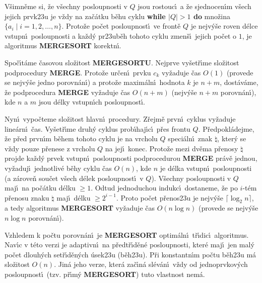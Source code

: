 \documentclass[a4paper,12pt]{article}
\begin{document}
\flushpar V\v simn\v eme si, \v ze v\v sechny posloupnosti v $Q$ jsou 
rostouc\'\i\ a \v ze sjednocen\'\i m v\v sech jejich prvk\accent23u  
je v\v zdy na za\v c\'atku b\v ehu cyklu {\bf while 
$|Q|>1$ do} mno\v zina $\{a_i\mid i=1,2,\dots,n\}$. 
Proto\v ze po\v cet 
posloupnost\'\i\ ve front\v e $Q$ je nejv\'y\v se roven d\'elce vstupn\'\i\ 
posloupnosti a ka\v zd\'y pr\accent23ub\v eh tohoto 
cyklu zmen\v s\'\i\ jejich po\v cet o $1$, je algoritmus {\bf MERGE\-SORT} korektn\'\i .
\medskip

\flushpar Spo\v c\'\i t\'ame \v casovou slo\v zitost {\bf MERGESORTU}. 
Nejprve vy\v set\v r\'\i me slo\-\v zi\-tost podprocedury {\bf MER\-GE}. Proto\v ze 
ur\v cen\'\i\ prvku $c_k$ vy\v za\-du\-je \v cas $O(1)$ (provede se 
nejv\'y\v se jedno porovn\'an\'\i ) a 
proto\v ze maxim\'aln\'\i\ hodnota $k$ je $n+m$, dost\'av\'ame, \v ze 
podprocedura {\bf MERGE} vy\v zaduje \v cas $O(n+m)$ (nejv\'y\v se $
n+m$ 
porovn\'an\'\i ), kde $n$ a $m$ jsou d\'elky vstupn\'\i ch posloupnost\'\i .
\medskip

\flushpar Nyn\'\i\ vypo\v cteme slo\v zitost hlavn\'\i\ procedury. 
Z\v rejm\v e prvn\'\i\ cyklus vy\v zaduje line\'arn\'\i\ \v cas. Vy\v set\v r\'\i me 
druh\'y cyklus prob\'\i haj\'\i c\'\i\ p\v res frontu $Q$. P\v redpokl\'adejme, \v ze p\v red prvn\'\i m b\v ehem 
tohoto cyklu je na vrcholu $Q$ speci\'aln\'\i\ znak $\natural$, kter\'y se v\v zdy 
pouze p\v renese z vrcholu $Q$ na jej\'\i\ konec. Proto\v ze mezi dv\v ema 
p\v renosy $\natural$ projde ka\v zd\'y prvek vstupn\'\i\ posloupnosti 
podprocedurou {\bf MERGE} pr\'av\v e jednou, vy\v zaduj\'\i\ jednotliv\'e b\v ehy cyklu 
\v cas $O(n)$, kde 
$n$ je d\'elka vstupn\'\i\ posloupnosti (a z\'arove\v n sou\v cet v\v sech d\'elek 
posloupnost\'\i\ v $Q$). V\v sech\-ny posloupnosti v $Q$ maj\'\i\  
na po\v c\'atku d\'elku $\ge 1$. Odtud jednoduchou indukc\'\i\ 
dostaneme, \v ze po $i$-t\'em p\v renosu znaku $\natural$ maj\'\i\ 
d\'elku $\ge 2^{i-1}$. Proto po\v cet p\v renos\accent23u je 
nejv\'y\v se $\lceil\log_2n\rceil$, a tedy algoritmus {\bf MERGESORT }
vy\v zaduje \v cas $O(n\log n)$ (provede se nejv\'y\v se $n\log n$ 
porovn\'an\'\i ).
\medskip

\flushpar Vzhledem k 
po\v ctu porovn\'an\'\i\ je {\bf MERGESORT} optim\'aln\'\i\ t\v r\'\i dic\'\i\ algoritmus. 
Nav\'\i c v t\'eto verzi je adaptivn\'\i\ na p\v redt\v r\'\i d\v en\'e 
posloupnosti, kter\'e maj\'\i\ jen mal\'y po\v cet dlouh\'ych 
set\v r\'\i d\v en\'ych \'usek\accent23u (b\v eh\accent23u). P\v ri 
konstantn\'\i m po\v ctu b\v eh\accent23u m\'a slo\v zitost $O(n)$. Jin\'a 
jeho verze, kter\'a za\v c\'\i n\'a sl\'ev\'an\'\i\ v\v zdy od 
jednoprvkov\'ych posloupnost\'\i\ (tzv. p\v r\'\i m\'y {\bf MERGESORT}) 
tuto vlastnost nem\'a. 
\bigskip
\end{document}
